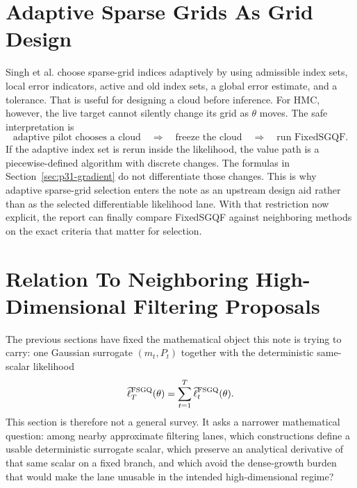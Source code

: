 \documentclass[11pt]{article}
\numberwithin{equation}{section}
\newcommand{\ellhat}{\widehat\ell}
\begin{document}
\section{Adaptive Sparse Grids As Grid Design}
\label{sec:p31-adaptive}

Singh et al. \cite{singh2018adaptive} choose sparse-grid indices adaptively by
using admissible index sets, local error indicators, active and old index
sets, a global error estimate, and a tolerance.  That is useful for designing a
cloud before inference.  For HMC, however, the live target cannot silently
change its grid as \(\theta\) moves.  The safe interpretation is
\begin{equation}
  \text{adaptive pilot chooses a cloud}
  \quad\Longrightarrow\quad
  \text{freeze the cloud}
  \quad\Longrightarrow\quad
  \text{run FixedSGQF}.
  \label{eq:p31-adaptive-to-fixed}
\end{equation}
If the adaptive index set is rerun inside the likelihood, the value path is a
piecewise-defined algorithm with discrete changes.  The formulas in
Section~\ref{sec:p31-gradient} do not differentiate those changes.  This is why
adaptive sparse-grid selection enters the note as an upstream design aid rather
than as the selected differentiable likelihood lane.  With that restriction now
explicit, the report can finally compare FixedSGQF against neighboring methods on
the exact criteria that matter for selection.

\section{Relation To Neighboring High-Dimensional Filtering Proposals}
\label{sec:p31-comparison}

The previous sections have fixed the mathematical object this note is trying to
carry: one Gaussian surrogate \((m_t,P_t)\) together with the deterministic
same-scalar likelihood
\begin{equation}
  \ellhat_T^{\rm FSGQ}(\theta)
  =
  \sum_{t=1}^T \ellhat_t^{\rm FSGQ}(\theta).
  \label{eq:p32-selection-fixedsgqf-scalar}
\end{equation}
This section is therefore not a general survey.  It asks a narrower mathematical
question: among nearby approximate filtering lanes, which constructions define a
usable deterministic surrogate scalar, which preserve an analytical derivative
of that same scalar on a fixed branch, and which avoid the dense-growth burden
that would make the lane unusable in the intended high-dimensional regime?
\end{document}
